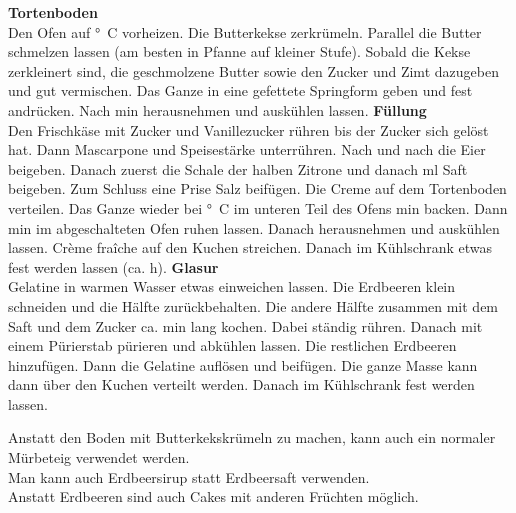 \begin{recipe}
	\preparation
	{
		\step \textbf{Tortenboden}\\
		Den Ofen auf \unit[175]{°C} vorheizen. Die Butterkekse zerkrümeln. Parallel die Butter schmelzen lassen (am besten in Pfanne auf kleiner Stufe). Sobald die Kekse zerkleinert sind, die geschmolzene Butter sowie den Zucker und Zimt dazugeben und gut vermischen. Das Ganze in eine gefettete Springform geben und fest andrücken. Nach \unit[10]{min} herausnehmen und auskühlen lassen.
		\step \textbf{Füllung} \\
		Den Frischkäse mit Zucker und Vanillezucker rühren bis der Zucker sich gelöst hat. Dann Mascarpone und Speisestärke unterrühren. Nach und nach die Eier beigeben. Danach zuerst die Schale der halben Zitrone und danach \unit[15]{ml} Saft beigeben. Zum Schluss eine Prise Salz beifügen.
		\step Die Creme auf dem Tortenboden verteilen. Das Ganze wieder bei \unit[175]{°C} im unteren Teil des Ofens \unit[50]{min} backen. Dann \unit[60]{min} im abgeschalteten Ofen ruhen lassen. Danach herausnehmen und auskühlen lassen.
		\step Crème fraîche auf den Kuchen streichen. Danach im Kühlschrank etwas fest werden lassen (ca. \unit[1-2]{h}). \newpage
		\step \textbf{Glasur}\\
		Gelatine in warmen Wasser etwas einweichen lassen. Die Erdbeeren klein schneiden und die Hälfte zurückbehalten. Die andere Hälfte zusammen mit dem Saft und dem Zucker ca. \unit[3]{min}  lang kochen. Dabei ständig rühren. Danach mit einem Pürierstab pürieren und abkühlen lassen. Die restlichen Erdbeeren hinzufügen. Dann die Gelatine auflösen und beifügen. Die ganze Masse kann dann über den Kuchen verteilt werden. Danach im Kühlschrank fest werden lassen.
	}
	
	\hint
	{
		Anstatt den Boden mit Butterkekskrümeln zu machen, kann auch ein normaler Mürbeteig verwendet werden. \\
		Man  kann auch Erdbeersirup statt Erdbeersaft verwenden.\\
		Anstatt Erdbeeren sind auch Cakes mit anderen Früchten möglich.
	}
\end{recipe}